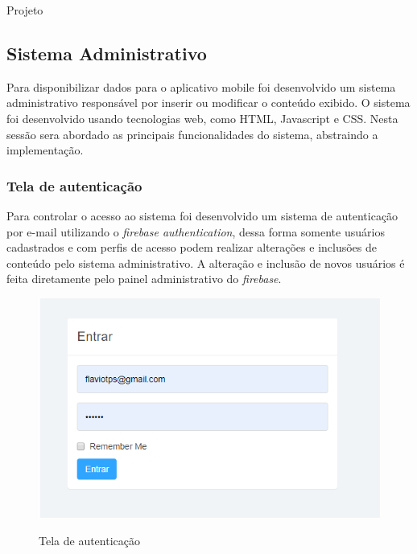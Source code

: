 \documentclass[
	12pt,				%
	openright,			%
	twoside,			%
	a4paper,			%
	english,			%
	french,				%
	spanish,			%
	brazil				%
	]{abntex2}
\begin{document}
\begin{chapter}{Projeto}
\newpage
\subsection{Sistema Administrativo}
Para disponibilizar dados para o aplicativo mobile foi desenvolvido um sistema administrativo responsável por inserir ou modificar o conteúdo exibido. O sistema foi desenvolvido usando tecnologias web, como HTML, Javascript e CSS. Nesta sessão sera abordado as principais funcionalidades do sistema, abstraindo a implementação.
\subsubsection{Tela de autenticação}
Para controlar o acesso ao sistema foi desenvolvido um sistema de autenticação por e-mail utilizando o \textit{firebase authentication}, dessa forma somente usuários cadastrados e com perfis de acesso podem realizar alterações e inclusões de conteúdo pelo sistema administrativo. 
A alteração e inclusão de novos usuários é feita diretamente pelo painel administrativo do \textit{firebase}.


\begin{figure}[h]
\centering
   \caption{Tela de autenticação}
   \includegraphics[scale=0.85]{media/tela_login_site_1.png}
     \label{fig:tela_login_site_1}
\end{figure}

\newpage

\end{chapter}
\end{document}
